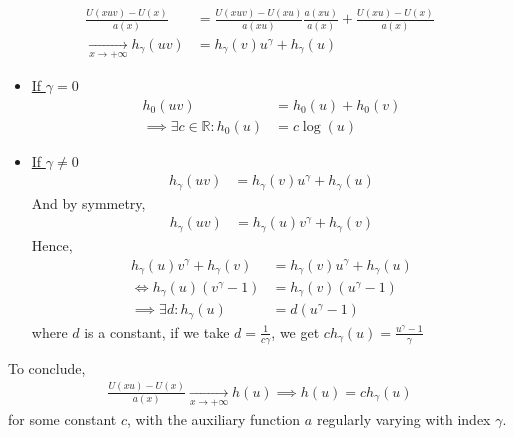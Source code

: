 \begin{equation}
\begin{alignat*}{2}
\frac{U(x u v) - U(x)}{a(x)} &= \frac{U(x u v) - U(x u)}{a(x u)} \frac{a(x u)}{a(x)} + \frac{U(x u) - U(x)}{a(x)} \\
\xrightarrow[x \rightarrow + \infty]{} h_\gamma(u v) &= h_\gamma(v) u^\gamma + h_\gamma(u)
\end{alignat*}
\end{equation}
\begin{itemize}
	\item \underline{If $\gamma = 0$} \\
	\begin{equation}
	\begin{alignat*}{2}
	h_0(u v) &= h_0(u) + h_0(v) \\
	\implies \exists c \in \mathbb{R} : h_0(u) &= c \log(u)
	\end{alignat*}
	\end{equation}\newline
	\item \underline{If $\gamma \ne 0$}
		\begin{equation}
		\begin{alignat*}{2}
		h_\gamma(u v) &= h_\gamma(v) u^\gamma + h_\gamma(u)
		\end{alignat*}
		\end{equation} And by symmetry,
		\begin{equation}
		\begin{alignat*}{2}
		h_\gamma(u v) &= h_\gamma(u) v^\gamma + h_\gamma(v)
		\end{alignat*}
		\end{equation} Hence,
		\begin{equation}
		\begin{alignat*}{2}
		h_\gamma(u) v^\gamma + h_\gamma(v) &= h_\gamma(v) u^\gamma + h_\gamma(u) \\
		\iff h_\gamma(u) (v^\gamma - 1) &= h_\gamma(v) (u^\gamma - 1) \\
		\implies \exists d : h_\gamma(u) &= d (u^\gamma - 1)
		\end{alignat*}
		\end{equation} where $d$ is a constant, if we take $d = \frac{1}{c \gamma}$, we get $c h_\gamma(u) = \frac{u^\gamma - 1}{\gamma}$
\end{itemize}
To conclude,
\begin{equation}
\begin{alignat*}{2}
\frac{U(x u) - U(x)}{a(x)} \xrightarrow[x \rightarrow + \infty]{} h(u)
\implies h(u) = c h_\gamma(u)
\end{alignat*}
\end{equation} for some constant $c$, with the auxiliary function $a$ regularly varying with index $\gamma$.
